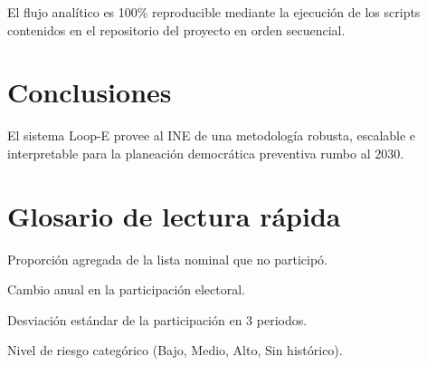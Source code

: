\documentclass[11pt,a4paper]{article}
\begin{document}
El flujo analítico es 100\% reproducible mediante la ejecución de los scripts contenidos en el repositorio del proyecto en orden secuencial.

\section{Conclusiones}

El sistema Loop-E provee al INE de una metodología robusta, escalable e interpretable para la planeación democrática preventiva rumbo al 2030.

\newpage
\appendix
\section{Glosario de lectura rápida}

\begin{description}[leftmargin=2.2cm,labelindent=0cm]
\item[Abstención] Proporción agregada de la lista nominal que no participó.
\item[Pendiente] Cambio anual en la participación electoral.
\item[Volatilidad] Desviación estándar de la participación en 3 periodos.
\item[Semáforo] Nivel de riesgo categórico (Bajo, Medio, Alto, Sin histórico).
\end{description}
\end{document}

